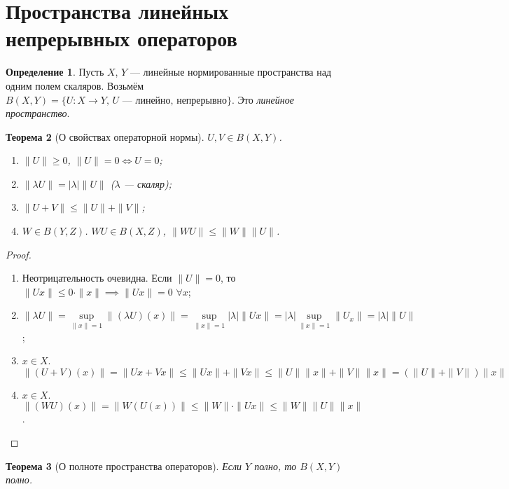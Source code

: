 \documentclass[11pt,openany,a4paper]{scrartcl}
\theoremstyle{plain}
\newtheorem{theorem}{Теорема}[section]
\theoremstyle{definition}
\newtheorem{definition}[theorem]{Определение}
\begin{document}
\section{Пространства линейных непрерывных операторов}
\begin{definition}
    Пусть $X$, $Y$ — линейные нормированные пространства над одним полем скаляров. Возьмём
    $B(X,Y) = \{U: X \to Y,\, U \text{ — линейно, непрерывно}\}$.
    Это \emph{линейное пространство}.
\end{definition}
\begin{theorem}[О свойствах операторной нормы]
    $U,V \in B(X, Y)$.
    \begin{enumerate}
        \item $\|U\| \geqslant 0$, $\|U\| = 0 \iff U = 0$;
        \item $\|\lambda U\| = |\lambda|\|U\|$ ($\lambda$ — скаляр);
        \item $\|U + V\| \leqslant \|U\| + \|V\|$;
        \item $W \in B(Y,Z)$. $WU \in B(X, Z)$, $\|WU\| \leqslant \|W\|\|U\|$.
    \end{enumerate}
\end{theorem}
\begin{proof}
\mbox{}
    \begin{enumerate}
        \item Неотрицательность очевидна. Если $\|U\|=0$, то $\|Ux\|\leqslant
        0\cdot \|x\| \implies \|Ux\| = 0$ $\forall x$;
        \item $\|\lambda U\| = \sup\limits_{\|x\|=1} \|(\lambda U)(x)\| =
         \sup\limits_{\|x\|=1} |\lambda|\|Ux\| = |\lambda| \sup\limits_{\|x\|=1}
         \|U_x\| =
         |\lambda|\|U\|$;
         \item $x \in X$. $\|(U+V)(x)\| = \|Ux + Vx\| \leqslant \|Ux\| + \|Vx\|
         \leqslant \|U\|\|x\| + \|V\|\|x\| = (\|U\| + \|V\|)\|x\|$
         \item $x \in X$. $\|(WU)(x)\| = \|W(U(x))\| \leqslant \|W\|\cdot \|Ux\|
         \leqslant \|W\|\|U\|\|x\|$.
    \end{enumerate}
\end{proof}
\begin{theorem}[О полноте пространства операторов]
    Если $Y$ полно, то $B(X, Y)$ полно.
\end{theorem}
\end{document}
